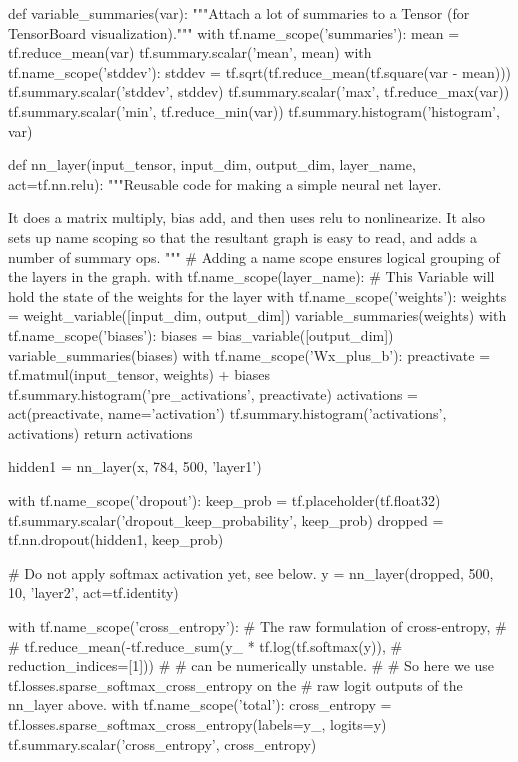  \begin{pythoncode}
 def variable_summaries(var):
   """Attach a lot of summaries to a Tensor (for TensorBoard visualization)."""
   with tf.name_scope('summaries'):
     mean = tf.reduce_mean(var)
     tf.summary.scalar('mean', mean)
     with tf.name_scope('stddev'):
       stddev = tf.sqrt(tf.reduce_mean(tf.square(var - mean)))
     tf.summary.scalar('stddev', stddev)
     tf.summary.scalar('max', tf.reduce_max(var))
     tf.summary.scalar('min', tf.reduce_min(var))
     tf.summary.histogram('histogram', var)
 
 def nn_layer(input_tensor, input_dim, output_dim, layer_name, act=tf.nn.relu):
   """Reusable code for making a simple neural net layer.
 
   It does a matrix multiply, bias add, and then uses relu to nonlinearize.
   It also sets up name scoping so that the resultant graph is easy to read,
   and adds a number of summary ops.
   """
   # Adding a name scope ensures logical grouping of the layers in the graph.
   with tf.name_scope(layer_name):
     # This Variable will hold the state of the weights for the layer
     with tf.name_scope('weights'):
       weights = weight_variable([input_dim, output_dim])
       variable_summaries(weights)
     with tf.name_scope('biases'):
       biases = bias_variable([output_dim])
       variable_summaries(biases)
     with tf.name_scope('Wx_plus_b'):
       preactivate = tf.matmul(input_tensor, weights) + biases
       tf.summary.histogram('pre_activations', preactivate)
     activations = act(preactivate, name='activation')
     tf.summary.histogram('activations', activations)
     return activations
 
 hidden1 = nn_layer(x, 784, 500, 'layer1')
 
 with tf.name_scope('dropout'):
   keep_prob = tf.placeholder(tf.float32)
   tf.summary.scalar('dropout_keep_probability', keep_prob)
   dropped = tf.nn.dropout(hidden1, keep_prob)
 
 # Do not apply softmax activation yet, see below.
 y = nn_layer(dropped, 500, 10, 'layer2', act=tf.identity)
 
 with tf.name_scope('cross_entropy'):
   # The raw formulation of cross-entropy,
   #
   # tf.reduce_mean(-tf.reduce_sum(y_ * tf.log(tf.softmax(y)),
   #                               reduction_indices=[1]))
   #
   # can be numerically unstable.
   #
   # So here we use tf.losses.sparse_softmax_cross_entropy on the
   # raw logit outputs of the nn_layer above.
   with tf.name_scope('total'):
     cross_entropy = tf.losses.sparse_softmax_cross_entropy(labels=y_, logits=y)
 tf.summary.scalar('cross_entropy', cross_entropy)
 

\end{pythoncode}
